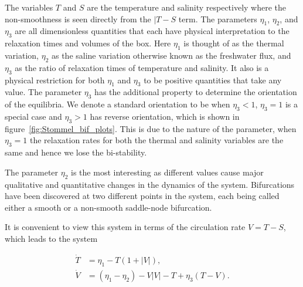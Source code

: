 The variables $T$ and $S$ are the temperature and salinity respectively where the non-smoothness is seen directly from the $|T-S$ term. The parameters $\eta_1$, $\eta_2$, and $\eta_3$ are all dimensionless quantities that each have physical interpretation to the relaxation times and volumes of the box. Here $\eta_1$ is thought of as the thermal variation, $\eta_2$ as the saline variation otherwise known as the freshwater flux, and $\eta_3$ as the ratio of relaxation times of temperature and salinity. It also is a physical restriction for both $\eta_1$ and $\eta_3$ to be positive quantities that take any value. The parameter $\eta_3$ has the additional property to determine the orientation of the equilibria. We denote a standard orientation to be when $\eta_3<1$, $\eta_3=1$ is a special case and $\eta_3>1$ has reverse orientation, which is shown in figure~\ref{fig:Stommel_bif_plots}. This is due to the nature of the parameter, when $\eta_3=1$ the relaxation rates for both the thermal and salinity variables are the same and hence we lose the bi-stability.

The parameter $\eta_2$ is the most interesting as different values cause major qualitative and quantitative changes in the dynamics of the system. Bifurcations have been discovered at two different points in the system, each being called either a smooth or a non-smooth saddle-node bifurcation.

It is convenient to view this system in terms of the circulation rate $V=T-S$, which leads to the system

\begin{equation}\label{eq:basic_stommel}
 \begin{aligned}
  \dot{T} & = \eta_1-T(1+|V|), \\
  \dot{V}   & = (\eta_1-\eta_2)-V|V|-T+\eta_3(T-V).
 \end{aligned}
\end{equation}

